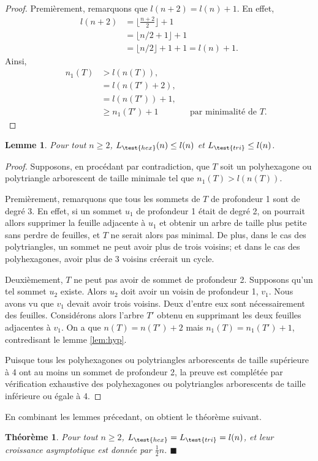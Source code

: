 \documentclass{article}
\newtheorem{thm}{Théorème}[section]
\newtheorem{lem}{Lemme}[section]
\theoremstyle{definition}
\newcommand{\Lhex}{L_{\test{hex}}}
\newcommand{\Ltri}{L_{\test{tri}}}
\begin{document}
\begin{proof}
   Premièrement, remarquons que $l(n + 2) = l(n) + 1$. En effet,
   \begin{align*}
      l(n+2) &= \lfloor \frac{n+2}{2} \rfloor + 1 \\
             &= \lfloor n/2 + 1 \rfloor + 1 \\
             &= \lfloor n/2 \rfloor + 1 + 1 = l(n) + 1.
   \end{align*}
   Ainsi,
   \begin{align*}
      && n_1(T) &> l(n(T)), && \\
      &&      &= l(n(T') + 2), && \\
      &&       &= l(n(T')) + 1, &&  \\
      &&       &\geq n_1(T') + 1 && \text{par minimalité de $T$.}
   \end{align*}
\end{proof}

\begin{lem}
   Pour tout $n \geq 2$, $\Lhex(n) \leq l(n)$ et $\Ltri \leq l(n)$.
\end{lem}

\begin{proof}
   Supposons, en procédant par contradiction, que $T$ soit un
   polyhexagone ou polytriangle arborescent de taille minimale 
   tel que $n_1(T) > l(n(T))$.

   Premièrement, remarquons que tous les sommets de $T$ de profondeur 
   1 sont de degré 3. En effet, si un sommet $u_1$ de profondeur 1 
   était de degré 2, on pourrait allors supprimer la feuille adjacente 
   à $u_1$ et obtenir un arbre de taille plus petite sans perdre 
   de feuilles, et $T$ ne serait alors pas minimal. De plus, dans 
   le cas des polytriangles, un sommet ne peut avoir plus de trois
   voisins; et dans le cas des polyhexagones, avoir plus de 3 voisins
   créerait un cycle.

   Deuxièmement, $T$ ne peut pas avoir de sommet de profondeur 2. 
   Supposons qu'un tel sommet $u_2$ existe. Alors $u_2$ doit avoir un 
   voisin de profondeur 1, $v_1$. Nous avons vu que $v_1$ devait avoir 
   trois voisins. Deux d'entre eux sont nécessairement des feuilles. 
   Considérons alors l'arbre $T'$ obtenu en supprimant les deux feuilles 
   adjacentes à $v_1$. On a que $n(T) = n(T') + 2$ mais $n_1(T) = 
   n_1(T') + 1$, contredisant le lemme \ref{lem:hyp}.

   Puisque tous les polyhexagones ou polytriangles arborescents de taille 
   supérieure à 4 ont au moins un sommet de profondeur 2, la preuve est 
   complétée par vérification exhaustive des polyhexagones ou 
   polytriangles arborescents de taille inférieure ou égale à 4.
\end{proof}

En combinant les lemmes précedant, on obtient le théorème suivant.

\begin{thm}
   Pour tout $n \geq 2$, $\Lhex = \Ltri = l(n)$, et leur croissance
   asymptotique est donnée par $\frac{1}{2}n$. \hfill $\blacksquare$
\end{thm}
\end{document}
